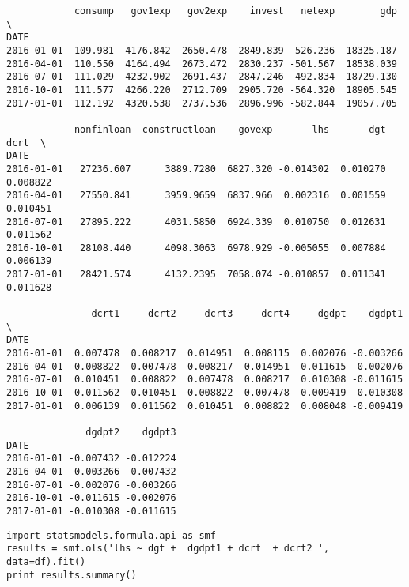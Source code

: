 \documentclass[12pt,fleqn]{article}\usepackage{../../common}
\begin{document}
\begin{verbatim}
            consump   gov1exp   gov2exp    invest   netexp        gdp  \
DATE                                                                    
2016-01-01  109.981  4176.842  2650.478  2849.839 -526.236  18325.187   
2016-04-01  110.550  4164.494  2673.472  2830.237 -501.567  18538.039   
2016-07-01  111.029  4232.902  2691.437  2847.246 -492.834  18729.130   
2016-10-01  111.577  4266.220  2712.709  2905.720 -564.320  18905.545   
2017-01-01  112.192  4320.538  2737.536  2896.996 -582.844  19057.705   

            nonfinloan  constructloan    govexp       lhs       dgt      dcrt  \
DATE                                                                            
2016-01-01   27236.607      3889.7280  6827.320 -0.014302  0.010270  0.008822   
2016-04-01   27550.841      3959.9659  6837.966  0.002316  0.001559  0.010451   
2016-07-01   27895.222      4031.5850  6924.339  0.010750  0.012631  0.011562   
2016-10-01   28108.440      4098.3063  6978.929 -0.005055  0.007884  0.006139   
2017-01-01   28421.574      4132.2395  7058.074 -0.010857  0.011341  0.011628   

               dcrt1     dcrt2     dcrt3     dcrt4     dgdpt    dgdpt1  \
DATE                                                                     
2016-01-01  0.007478  0.008217  0.014951  0.008115  0.002076 -0.003266   
2016-04-01  0.008822  0.007478  0.008217  0.014951  0.011615 -0.002076   
2016-07-01  0.010451  0.008822  0.007478  0.008217  0.010308 -0.011615   
2016-10-01  0.011562  0.010451  0.008822  0.007478  0.009419 -0.010308   
2017-01-01  0.006139  0.011562  0.010451  0.008822  0.008048 -0.009419   

              dgdpt2    dgdpt3  
DATE                            
2016-01-01 -0.007432 -0.012224  
2016-04-01 -0.003266 -0.007432  
2016-07-01 -0.002076 -0.003266  
2016-10-01 -0.011615 -0.002076  
2017-01-01 -0.010308 -0.011615  
\end{verbatim}

\begin{verbatim}
import statsmodels.formula.api as smf
results = smf.ols('lhs ~ dgt +  dgdpt1 + dcrt  + dcrt2 ', data=df).fit()
print results.summary()
\end{verbatim}
\end{document}
